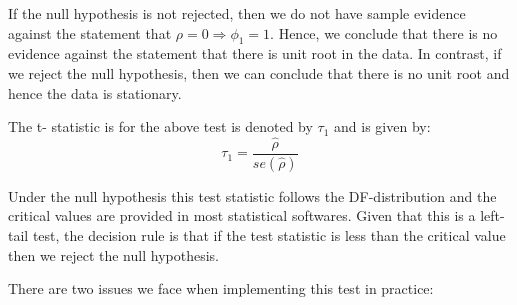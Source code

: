 \documentclass[]{book}
\theoremstyle{definition}
\theoremstyle{definition}
\theoremstyle{definition}
\theoremstyle{remark}
\begin{document}
If the null hypothesis is not rejected, then we do not have sample
evidence against the statement that \(\rho=0 \Rightarrow \phi_1=1\).
Hence, we conclude that there is no evidence against the statement that
there is unit root in the data. In contrast, if we reject the null
hypothesis, then we can conclude that there is no unit root and hence
the data is stationary.

The t- statistic is for the above test is denoted by \(\tau_1\) and is
given by: \[\tau_1 =\frac{\hat{\rho}}{se(\hat{\rho})}\]

Under the null hypothesis this test statistic follows the
DF-distribution and the critical values are provided in most statistical
softwares. Given that this is a left-tail test, the decision rule is
that if the test statistic is less than the critical value then we
reject the null hypothesis.

There are two issues we face when implementing this test in practice:
\end{document}
